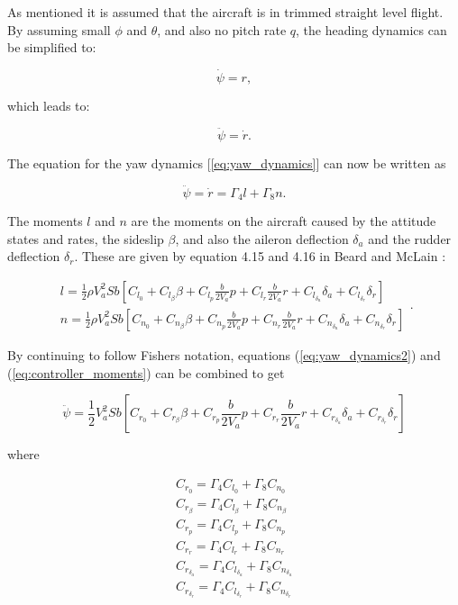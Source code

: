 As mentioned it is assumed that the aircraft is in trimmed straight level flight. By assuming small $\phi$ and $\theta$, and also no pitch rate $q$, the heading dynamics can be simplified to:

\begin{equation}
	\dot{\psi} = r,
\end{equation}

which leads to:

\begin{equation}
	\ddot{\psi} = \dot{r}.
\end{equation}

The equation for the yaw dynamics [\ref{eq:yaw_dynamics}] can now be written as

\begin{equation}
	\label{eq:yaw_dynamics2}
	\ddot{\psi} = \dot{r} = \Gamma_4l + \Gamma_8n.
\end{equation}

The moments $l$ and $n$ are the moments on the aircraft caused by the attitude states and rates, the sideslip $\beta$, and also the aileron deflection $\delta_a$ and the rudder deflection $\delta_r$. These are given by equation 4.15 and 4.16 in Beard and McLain \cite{suaBEARD}:

\begin{equation}
\begin{gathered}
	\label{eq:controller_moments}
	l = \frac{1}{2} \rho V_a^2Sb[C_{l_0} + C_{l_\beta}\beta + C_{l_p}\frac{b}{2V_a}p + C_{l_r}\frac{b}{2V_a}r + C_{l_{\delta_a}}\delta_a + C_{l_{\delta_r}}\delta_r]
	\\
	n = \frac{1}{2} \rho V_a^2Sb[C_{n_0} + C_{n_\beta}\beta + C_{n_p}\frac{b}{2V_a}p + C_{n_r}\frac{b}{2V_a}r + C_{n_{\delta_a}}\delta_a + C_{n_{\delta_r}}\delta_r]
\end{gathered}
.
\end{equation}

By continuing to follow Fishers \cite{ratcFISHER} notation, equations (\ref{eq:yaw_dynamics2}) and (\ref{eq:controller_moments}) can be combined to get

\begin{equation}
	\label{eq:yaw_dynamics_final}
	\ddot{\psi} = \frac{1}{2}V_a^2Sb[C_{r_0} + C_{r_\beta}\beta + C_{r_p}\frac{b}{2V_a}p + C_{r_r}\frac{b}{2V_a}r + C_{r_{\delta_a}}\delta_a + C_{r_{\delta_r}}\delta_r]
\end{equation}

where

\begin{equation}
\begin{gathered}
	C_{r_0} = \Gamma_4C_{l_0} + \Gamma_8C_{n_0}
	\\
	C_{r_\beta} = \Gamma_4C_{l_\beta} + \Gamma_8C_{n_\beta}
	\\
	C_{r_p} = \Gamma_4C_{l_p} + \Gamma_8C_{n_p}
	\\
	C_{r_r} = \Gamma_4C_{l_r} + \Gamma_8C_{n_r}
	\\
	C_{r_{\delta_a}} = \Gamma_4C_{l_{\delta_a}} + \Gamma_8C_{n_{\delta_a}}
	\\
	C_{r_{\delta_r}} = \Gamma_4C_{l_{\delta_r}} + \Gamma_8C_{n_{\delta_r}}
\end{gathered}
\end{equation}

